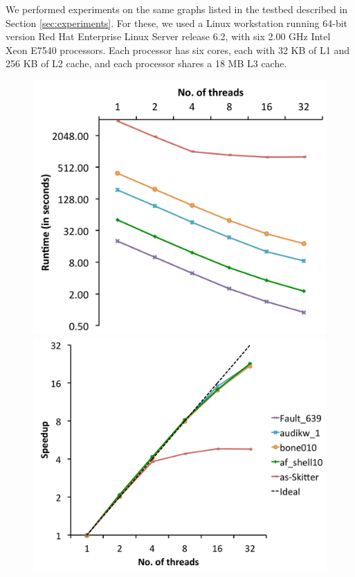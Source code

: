 We performed experiments on the same graphs listed in the testbed described in Section \ref{sec:experiments}. For these, we used a Linux workstation running 64-bit version Red Hat Enterprise Linux Server release 6.2, with six 2.00 GHz Intel Xeon E7540 processors. Each processor has six cores, each with 32 KB of L1 and 256 KB of L2 cache, and each processor shares a 18 MB L3 cache.  


\begin{figure}
  \centering
    \includegraphics[scale=0.17]{parallel_realworld_timing.pdf}
    \includegraphics[scale=0.17]{parallel_realworld_speedup.pdf}

\end{figure}
